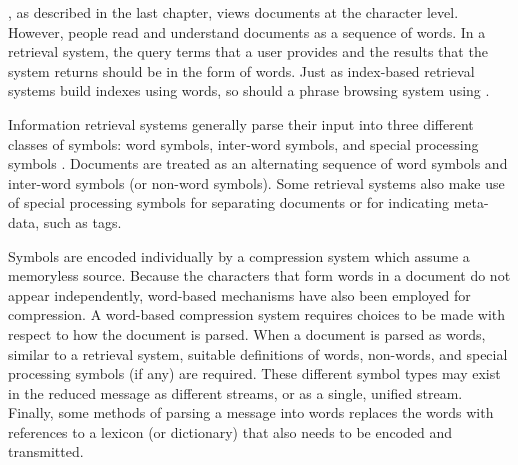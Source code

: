 
\repair, as described in the last chapter, views documents at the
character level.  However, people read and understand documents as a
sequence of words.  In a retrieval system, the query terms 
that a user provides and the results that the system returns
should be in the form of words.  Just as index-based retrieval systems 
build indexes using words, so should a phrase
browsing system using \repair.

Information retrieval systems generally parse their input 
into three different classes of symbols:  word symbols, inter-word
symbols, and special processing symbols 
\citep{kowalski97:book}.  Documents are treated as an
alternating sequence of word symbols and inter-word symbols (or
non-word symbols).  Some retrieval systems also make use of special 
processing symbols for separating documents
\citep{wmb99:book} or for indicating meta-data, such as
\sgml tags.

Symbols are encoded individually by a compression system
which assume a memoryless source.  Because the characters
that form words in a document do not appear independently,
word-based mechanisms have also been employed for compression.
A word-based compression system requires
choices to be made with respect
to how the document is parsed.  When a document is parsed as 
words, similar to a retrieval system, suitable definitions of 
words, non-words, and special processing symbols (if any) are 
required.  These different symbol types may exist in the 
reduced message as different streams, or as a single, unified
stream.  Finally, some methods of parsing a message into words
replaces the words with references to a lexicon (or dictionary) 
that also needs to be encoded and transmitted.

